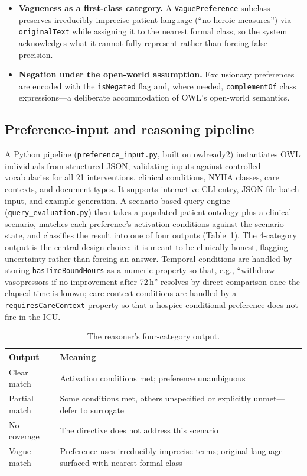 \documentclass[10pt]{article}
\newcommand{\onto}[1]{\texttt{\small #1}}
\begin{document}
\begin{itemize}[nosep,leftmargin=1.4em]
\item \textbf{Vagueness as a first-class category.} A \onto{VaguePreference} subclass preserves irreducibly imprecise patient language (``no heroic measures'') via \onto{originalText} while assigning it to the nearest formal class, so the system acknowledges what it cannot fully represent rather than forcing false precision.
\item \textbf{Negation under the open-world assumption.} Exclusionary preferences are encoded with the \onto{isNegated} flag and, where needed, \onto{complementOf} class expressions---a deliberate accommodation of OWL's open-world semantics.\cite{owl2primer}
\end{itemize}

\subsection{Preference-input and reasoning pipeline}
A Python pipeline (\texttt{preference\_input.py}, built on owlready2\cite{owlready2}) instantiates OWL individuals from structured JSON, validating inputs against controlled vocabularies for all 21 interventions, clinical conditions, NYHA classes, care contexts, and document types. It supports interactive CLI entry, JSON-file batch input, and example generation. A scenario-based query engine (\texttt{query\_evaluation.py}) then takes a populated patient ontology plus a clinical scenario, matches each preference's activation conditions against the scenario state, and classifies the result into one of four outputs (Table~\ref{tab:outputs}). The 4-category output is the central design choice: it is meant to be clinically honest, flagging uncertainty rather than forcing an answer. Temporal conditions are handled by storing \onto{hasTimeBoundHours} as a numeric property so that, e.g., ``withdraw vasopressors if no improvement after 72\,h'' resolves by direct comparison once the elapsed time is known; care-context conditions are handled by a \onto{requiresCareContext} property so that a hospice-conditional preference does not fire in the ICU.

\begin{table}[ht]
\centering
\caption{The reasoner's four-category output.}
\label{tab:outputs}
\small
\begin{tabularx}{0.95\textwidth}{lX}
\toprule
\textbf{Output} & \textbf{Meaning} \\
\midrule
Clear match & Activation conditions met; preference unambiguous \\
Partial match & Some conditions met, others unspecified or explicitly unmet---defer to surrogate \\
No coverage & The directive does not address this scenario \\
Vague match & Preference uses irreducibly imprecise terms; original language surfaced with nearest formal class \\
\bottomrule
\end{tabularx}
\end{table}
\end{document}
